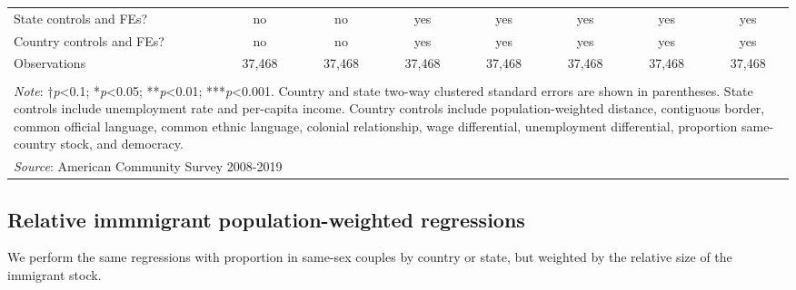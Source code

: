 \documentclass[
  11pt,
]{article}
\begin{document}
\begin{table}[H]
\begin{tabular}{@{\extracolsep{5pt}}lccccccc}
State controls and FEs? & no & no & yes & yes & yes & yes & yes \\ 
Country controls and FEs? & no & no & yes & yes & yes & yes & yes \\ 
Observations & 37,468 & 37,468 & 37,468 & 37,468 & 37,468 & 37,468 & 37,468 \\ 
\hline 
\hline \\[-1.8ex] 
\multicolumn{8}{l}{\parbox[t]{\textwidth}{\textit{Note}: †\textit{p}<0.1; *\textit{p}<0.05; **\textit{p}<0.01; ***\textit{p}<0.001. Country and state two-way clustered standard errors are shown in parentheses. State controls include unemployment rate and per-capita income. Country controls include population-weighted distance, contiguous border, common official language, common ethnic language, colonial relationship, wage differential, unemployment differential, proportion same-country stock, and democracy.}} \\ 
\multicolumn{8}{l}{\textit{Source}: American Community Survey 2008-2019} \\ 
\end{tabular} 
\end{table}

\newpage

\hypertarget{relative-immmigrant-population-weighted-regressions}{%
\subsection{Relative immmigrant population-weighted regressions}\label{relative-immmigrant-population-weighted-regressions}}

We perform the same regressions with proportion in same-sex couples by country or state, but weighted by the relative size of the immigrant stock.
\end{document}
